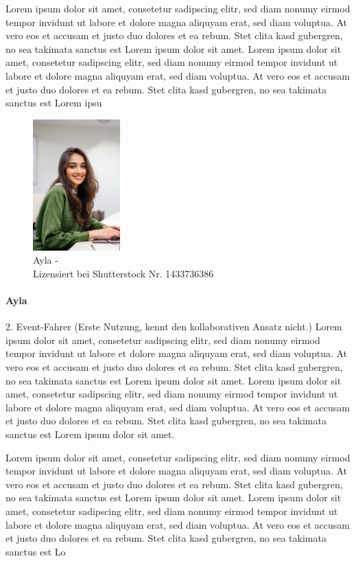 Lorem ipsum dolor sit amet, consetetur sadipscing elitr, sed diam nonumy eirmod tempor invidunt ut labore et dolore magna aliquyam erat, sed diam voluptua. At vero eos et accusam et justo duo dolores et ea rebum. Stet clita kasd gubergren, no sea takimata sanctus est Lorem ipsum dolor sit amet. Lorem ipsum dolor sit amet, consetetur sadipscing elitr, sed diam nonumy eirmod tempor invidunt ut labore et dolore magna aliquyam erat, sed diam voluptua. At vero eos et accusam et justo duo dolores et ea rebum. Stet clita kasd gubergren, no sea takimata sanctus est Lorem ipsu

\bigbreak

\begin{figure}
    \vspace{-\intextsep}
    \centering
    \includegraphics[width=0.3\textwidth]{contents/06_model_evaluation/01_integration/res/persona_picture_ayla.png}
    \caption{Ayla -\\Lizensiert bei Shutterstock Nr. 1433736386}
\end{figure}

\paragraph{Ayla} 2. Event-Fahrer (Erste Nutzung, kennt den kollaborativen Ansatz nicht.) Lorem ipsum dolor sit amet, consetetur sadipscing elitr, sed diam nonumy eirmod tempor invidunt ut labore et dolore magna aliquyam erat, sed diam voluptua. At vero eos et accusam et justo duo dolores et ea rebum. Stet clita kasd gubergren, no sea takimata sanctus est Lorem ipsum dolor sit amet. Lorem ipsum dolor sit amet, consetetur sadipscing elitr, sed diam nonumy eirmod tempor invidunt ut labore et dolore magna aliquyam erat, sed diam voluptua. At vero eos et accusam et justo duo dolores et ea rebum. Stet clita kasd gubergren, no sea takimata sanctus est Lorem ipsum dolor sit amet.

Lorem ipsum dolor sit amet, consetetur sadipscing elitr, sed diam nonumy eirmod tempor invidunt ut labore et dolore magna aliquyam erat, sed diam voluptua. At vero eos et accusam et justo duo dolores et ea rebum. Stet clita kasd gubergren, no sea takimata sanctus est Lorem ipsum dolor sit amet. Lorem ipsum dolor sit amet, consetetur sadipscing elitr, sed diam nonumy eirmod tempor invidunt ut labore et dolore magna aliquyam erat, sed diam voluptua. At vero eos et accusam et justo duo dolores et ea rebum. Stet clita kasd gubergren, no sea takimata sanctus est Lo
